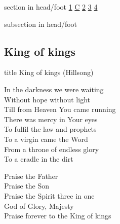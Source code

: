 \documentclass{beamer}
\begin{document}
{
{ 
 {
 \begin{beamercolorbox}[ht=4.5ex,dp=1.5ex,%
      leftskip=.3cm,rightskip=.3cm plus1fil]{section in head/foot}
 \fontsize{12}{25}\selectfont 
\hyperlink{King of kings[](Hillsong)1}{1}
\hyperlink{King of kings[](Hillsong)C}{C}
\hyperlink{King of kings[](Hillsong)2}{2}
\hyperlink{King of kings[](Hillsong)3}{3}
\hyperlink{King of kings[](Hillsong)4}{4}
 
 \end{beamercolorbox}%
  \begin{beamercolorbox}[ht=2.5ex,dp=1.125ex,%
   leftskip=.3cm,rightskip=.3cm plus1fil]{subsection in head/foot}
   \insertauthor
 \end{beamercolorbox}%
 }
}
\subsection{ King of kings }

\hypertarget{King of kings[](Hillsong)}{}
\begin{frame}{}
 \vfill
  \centering
  \begin{beamercolorbox}[sep=8pt,center,shadow=true,rounded=true]{title}
    King of kings (Hillsong)    
  \end{beamercolorbox}
  \vfill
\end{frame}

\hypertarget{King of kings[](Hillsong)1}{}
\begin{frame}{}
\fontsize{ 18 }{ 23 }\selectfont

In the darkness we were waiting\\ 
Without hope without light\\ 
Till from Heaven You came running\\ 
There was mercy in Your eyes\\ 
To fulfil the law and prophets\\ 
To a virgin came the Word\\ 
From a throne of endless glory\\ 
To a cradle in the dirt 

\end{frame}

\hypertarget{King of kings[](Hillsong)C}{}
\begin{frame}{}
\fontsize{ 18 }{ 23 }\selectfont

Praise the Father\\ 
Praise the Son\\ 
Praise the Spirit three in one\\ 
God of Glory, Majesty\\ 
Praise forever to the King of kings 


\end{frame}}
\end{document}
